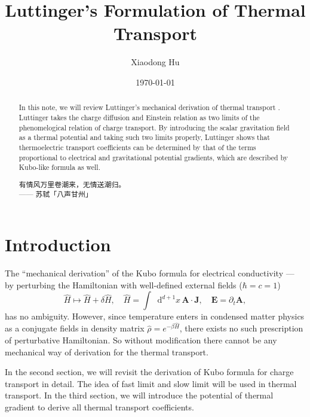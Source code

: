 \documentclass[10pt,nofootinbib,letterpaper]{revtex4}
\newcommand*{\kaishu}{\CJKfamily{kaishu}}
\newcommand*\dd{\mathop{}\!\mathrm{d}}
\begin{document}
\title{Luttinger's Formulation of Thermal Transport}
\author{Xiaodong Hu}

\date{\today}

\begin{abstract}
	In this note, we will review Luttinger's mechanical derivation of thermal transport \cite{luttinger1964theory}. Luttinger takes the charge diffusion and Einstein relation as two limits of the phenomelogical relation of charge transport. By introducing the scalar gravitation field as a thermal potential and taking such two limits properly, Luttinger shows that thermoelectric transport coefficients can be determined by that of the terms proportional to electrical and gravitational potential gradients, which are described by Kubo-like formula as well.\par
		\hfill\par
		{\centering\kaishu 有情风万里卷潮来，无情送潮归。\\[0.5em]}
	\hfill------ 苏轼「八声甘州」
\end{abstract}

\maketitle
\tableofcontents

\section{Introduction}
	The ``mechanical derivation'' of the Kubo formula for electrical conductivity --- by perturbing the Hamiltonian with well-defined external fields ($\hbar=c=1$)
	\begin{equation*}
		\hat H\mapsto\hat H+\delta\hat H,\quad\hat H=\int\dd^{d+1}x\,\bm{A}\cdot\bm{J},\quad \bm{E}=\partial_t\bm{A},
	\end{equation*}
	has no ambiguity. However, {\color{red}since temperature enters in condensed matter physics as a conjugate fields in density matrix $\hat\rho=e^{-\beta\hat H}$, there exists no such prescription of perturbative Hamiltonian. So without modification there cannot be any mechanical way of derivation for the thermal transport}.\par

	In the second section, we will revisit the derivation of Kubo formula for charge transport in detail. The idea of fast limit and slow limit will be used in thermal transport. In the third section, we will introduce the potential of thermal gradient to derive all thermal transport coefficients.
\end{document}
